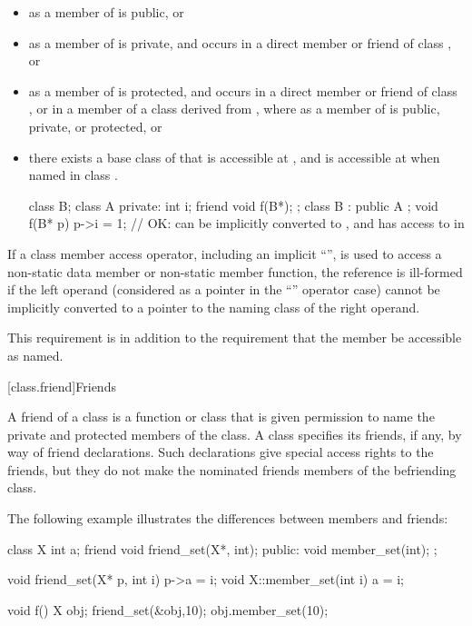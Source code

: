\begin{itemize}
\item
{}
as a member of
is public, or
\item
{}
as a member of
is private, and
occurs in a direct member or friend of class
,
or
\item
{}
as a member of
is protected, and
occurs in a direct member or friend of class
,
or in a member of a class
derived from
,
where
as a member of
is public, private, or protected, or
\item
there exists a base class
of
that is accessible at
,
and
is accessible at
when named in class
.
\begin{example}
\begin{codeblock}
class B;
class A {
private:
  int i;
  friend void f(B*);
};
class B : public A { };
void f(B* p) {
  p->i = 1;         // OK:  can be implicitly converted to , and  has access to  in 
}
\end{codeblock}
\end{example}
\end{itemize}

\pnum
If a class member access operator, including an implicit
``'',
is used to access a non-static data member or non-static
member function, the reference is ill-formed if the
left operand (considered as a pointer in the
``''
operator case) cannot be implicitly converted to a
pointer to the naming class of the right operand.
\begin{note}
This requirement is in addition to the requirement that
the member be accessible as named.
\end{note}

[class.friend]{Friends}%
%

\pnum
A friend of a class is a function or class that is
given permission to name the private and protected members of the class.
A class specifies its friends, if any, by way of friend declarations.
Such declarations give special access rights to the friends, but they
do not make the nominated friends members of the befriending class.
\begin{example}
The following example illustrates the differences between
members and friends:
%

\begin{codeblock}
class X {
  int a;
  friend void friend_set(X*, int);
public:
  void member_set(int);
};

void friend_set(X* p, int i) { p->a = i; }
void X::member_set(int i) { a = i; }

void f() {
  X obj;
  friend_set(&obj,10);
  obj.member_set(10);
}
\end{codeblock}
\end{example}

